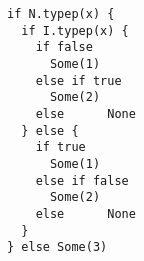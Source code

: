 \begin{lstlisting}[style=reclojureScala]
if N.typep(x) {
  if I.typep(x) {
    if false
      Some(1)
    else if true
      Some(2)
    else      None
  } else {
    if true
      Some(1)
    else if false
      Some(2)
    else      None
  }
} else Some(3)
\end{lstlisting}
